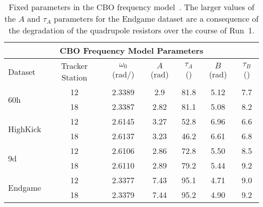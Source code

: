 \begin{table}
\centering
\small
\setlength\tabcolsep{10pt}
\renewcommand{\arraystretch}{1.2}
\begin{tabular*}{1\linewidth}{@{\extracolsep{\fill}}lcccccc}
  \hline
    \multicolumn{7}{c}{\textbf{CBO Frequency Model Parameters}} \\
  \hline\hline
    Dataset & Tracker Station & $\omega_{0}$ (rad/\mus{}) & $A$ (rad) & $\tau_{A}$ (\mus{}) & $B$ (rad) & $\tau_{B}$ (\mus{}) \\
  \hline
    \multirow{2}{*}{60h} & 12 & 2.3389 & 2.9 & 81.8 & 5.12 & 7.7 \\
                         & 18 & 2.3387 & 2.82 & 81.1 & 5.08 & 8.2 \\
  \hline
    \multirow{2}{*}{HighKick} & 12 & 2.6145 & 3.27 & 52.8 & 6.96 & 6.6 \\
                              & 18 & 2.6137 & 3.23 & 46.2 & 6.61 & 6.8 \\
  \hline
    \multirow{2}{*}{9d} & 12 & 2.6106 & 2.86 & 72.8 & 5.50 & 8.5 \\
                        & 18 & 2.6110 & 2.89 & 79.2 & 5.44 & 9.2 \\
  \hline
    \multirow{2}{*}{Endgame} & 12 & 2.3377 & 7.43 & 95.1 & 4.71 & 9.0 \\
                             & 18 & 2.3379 & 7.44 & 95.2 & 4.90 & 9.2 \\                                                        
  \hline
\end{tabular*}
\caption[Dataset CBO frequency model parameters]{Fixed parameters in the CBO frequency model~\cite{CBOFreqTrackingElog,JamesPersonalComm}. The larger values of the $A$ and $\tau_{A}$ parameters for the Endgame dataset are a consequence of the degradation of the quadrupole resistors over the course of Run~1.}
\label{tab:CBOFrequencyParameters}
\end{table}



